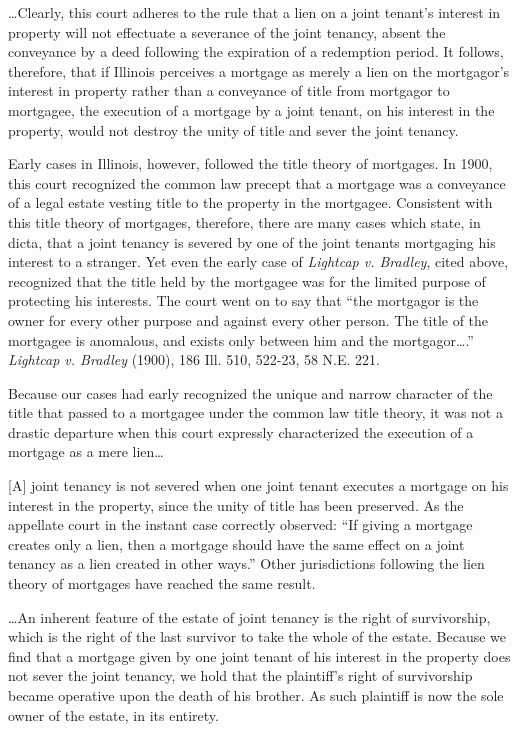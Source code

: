  \dots Clearly, this court adheres to the rule that a lien on a joint tenant's
interest in property will not effectuate a severance of the joint tenancy,
absent the conveyance by a deed following the expiration of a redemption
period. It follows, therefore, that if Illinois perceives a mortgage as merely
a lien on the mortgagor's interest in property rather than a conveyance of
title from mortgagor to mortgagee, the execution of a mortgage by a joint
tenant, on his interest in the property, would not destroy the unity of title
and sever the joint tenancy.

Early cases in Illinois, however, followed the title theory of mortgages. In
1900, this court recognized the common law precept that a mortgage was a
conveyance of a legal estate vesting title to the property in the mortgagee.
Consistent with this title theory of mortgages, therefore, there are many cases
which state, in dicta, that a joint tenancy is severed by one of the joint
tenants mortgaging his interest to a stranger. Yet even the early case of
\emph{Lightcap v. Bradley}, cited above, recognized that the title held by the
mortgagee was for the limited purpose of protecting his interests. The court
went on to say that ``the mortgagor is the owner for every other purpose and
against every other person. The title of the mortgagee is anomalous, and exists
only between him and the mortgagor\ldots.'' \emph{Lightcap v. Bradley} (1900),
186 Ill. 510, 522-23, 58 N.E. 221.

Because our cases had early recognized the unique and narrow character of the
title that passed to a mortgagee under the common law title theory, it was not
a drastic departure when this court expressly characterized the execution of a
mortgage as a mere lien\dots

[A] joint tenancy is not severed when one joint tenant executes a mortgage on
his interest in the property, since the unity of title has been preserved. As
the appellate court in the instant case correctly observed: ``If giving a
mortgage creates only a lien, then a mortgage should have the same effect on a
joint tenancy as a lien created in other ways.'' Other jurisdictions following
the lien theory of mortgages have reached the same result.

\dots An inherent feature of the estate of joint tenancy is the right of
survivorship, which is the right of the last survivor to take the whole of the
estate. Because we find that a mortgage given by one joint tenant of his
interest in the property does not sever the joint tenancy, we hold that the
plaintiff's right of survivorship became operative upon the death of his
brother. As such plaintiff is now the sole owner of the estate, in its
entirety.

